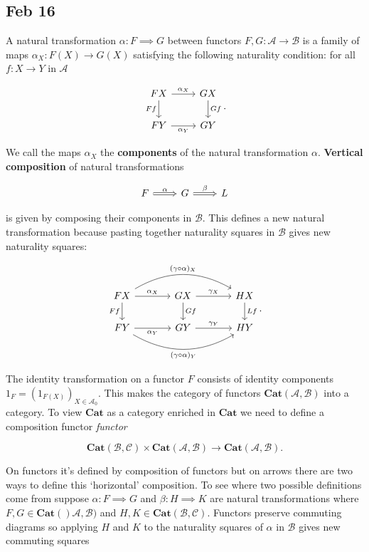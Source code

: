 \documentclass[11pt]{amsart}
\theoremstyle{plain}
\theoremstyle{definition}
\newcommand{\cA}{{\mathcal A}}
\newcommand{\cB}{{\mathcal B}}
\newcommand{\cC}{{\mathcal C}}
\newcommand{\Cat}{\mathbf{Cat}}
\newcommand{\noi}{{\noindent}}
\begin{document}
\subsection{Feb 16}

A natural transformation $\alpha : F \implies G$ between functors $F, G : \cA \to \cB$ is a family of maps $\alpha_X : F(X) \to G(X)$ satisfying the following naturality condition:  for all $f : X \to Y$ in $\cA$

\[ \begin{tikzcd}
  FX \rar["\alpha_X"] \dar["Ff"'] & GX \dar["Gf"] \\
FY \rar["\alpha_Y"'] & GY
\end{tikzcd}.\]

\noi We call the maps $\alpha_X$ the \textbf{components} of the natural transformation $\alpha$. \textbf{Vertical composition} of natural transformations 

\[ \begin{tikzcd}F \rar[Rightarrow, "\alpha"] &  G \rar[Rightarrow, "\beta"] &  L \end{tikzcd}\]

\noi is given by composing their components in $\cB$. This defines a new natural transformation because pasting together naturality squares in $\cB$ gives new naturality squares: 

\[ \begin{tikzcd}[column sep = large]
  FX \ar[rr, bend left, "(\gamma \circ \alpha)_X"] \dar["Ff"'] \rar["\alpha_X"]& GX \dar["Gf"] \rar["\gamma_X"]& HX \dar["Lf"] \\
F Y \ar[rr, bend right, "(\gamma\circ \alpha)_Y"'] \rar["\alpha_Y"'] & GY \rar["\gamma_Y"]& HY
\end{tikzcd}.\]

\noi The identity transformation on a functor $F$ consists of identity components $1_F = (1_{F(X)})_{X \in \cA_0}$. This makes the category of functors $\Cat(\cA, \cB)$ into a category. To view $\Cat$ as a category enriched in $\Cat$ we need to define a composition functor \textit{functor} 

\[ \Cat(\cB, \cC) \times \Cat(\cA, \cB) \to \Cat(\cA,\cB).\]

\noi On functors it's defined by composition of functors but on arrows there are two ways to define this `horizontal' composition. To see where two possible definitions come from suppose $\alpha : F \implies G$ and $\beta : H \implies K$ are natural transformations where $F,G \in \Cat()\cA, \cB)$ and $H,K \in \Cat( \cB, \cC)$. Functors preserve commuting diagrams so applying $H$ and $K$ to the naturality squares of $\alpha$ in $\cB$ gives new commuting squares 
\end{document}
